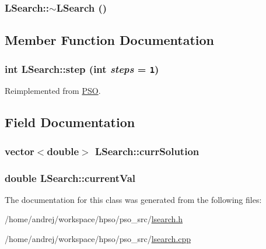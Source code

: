 \hypertarget{classLSearch_d61ebeeb7e15d2e5553317687a604101}{
\subsubsection{\setlength{\rightskip}{0pt plus 5cm}LSearch::$\sim$LSearch ()}}
\label{classLSearch_d61ebeeb7e15d2e5553317687a604101}




\subsection{Member Function Documentation}
\hypertarget{classLSearch_bac6ce81e34ee717b854ec1772962883}{
\subsubsection{\setlength{\rightskip}{0pt plus 5cm}int LSearch::step (int {\em steps} = {\tt 1})}}
\label{classLSearch_bac6ce81e34ee717b854ec1772962883}




Reimplemented from \hyperlink{classPSO_3a301551494012faac2c6db981ae269e}{PSO}.

\subsection{Field Documentation}
\hypertarget{classLSearch_1bae97be8b9bb5d3cd4cc962a87d878c}{
\subsubsection{\setlength{\rightskip}{0pt plus 5cm}vector$<$double$>$ {\bf LSearch::currSolution}}}
\label{classLSearch_1bae97be8b9bb5d3cd4cc962a87d878c}


\hypertarget{classLSearch_02c68c126e7e8714fede96362658de8d}{
\subsubsection{\setlength{\rightskip}{0pt plus 5cm}double {\bf LSearch::currentVal}}}
\label{classLSearch_02c68c126e7e8714fede96362658de8d}




The documentation for this class was generated from the following files:\begin{CompactItemize}
\item 
/home/andrej/workspace/hpso/pso\_\-src/\hyperlink{lsearch_8h}{lsearch.h}\item 
/home/andrej/workspace/hpso/pso\_\-src/\hyperlink{lsearch_8cpp}{lsearch.cpp}\end{CompactItemize}
